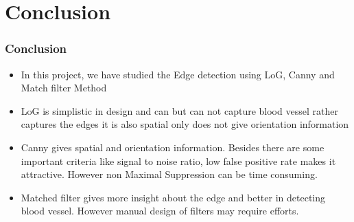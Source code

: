 \documentclass[11pt]{beamer}
\begin{document}
\section{Conclusion}
\begin{frame}
\frametitle{Conclusion}
\begin{itemize}
	\item In this project, we have studied the Edge detection using LoG, Canny and Match filter Method
	\item LoG is simplistic in design and can but can not capture blood vessel rather captures the edges it is also spatial only does not give orientation information
	\item Canny gives spatial and orientation information. Besides there are some important criteria like signal to noise ratio, low false positive rate makes it attractive. However non Maximal Suppression can be time consuming.
	\item Matched filter gives more insight about the edge and better in detecting blood vessel. However manual design of filters may require efforts.
\end{itemize}
\end{frame}


\end{document}
